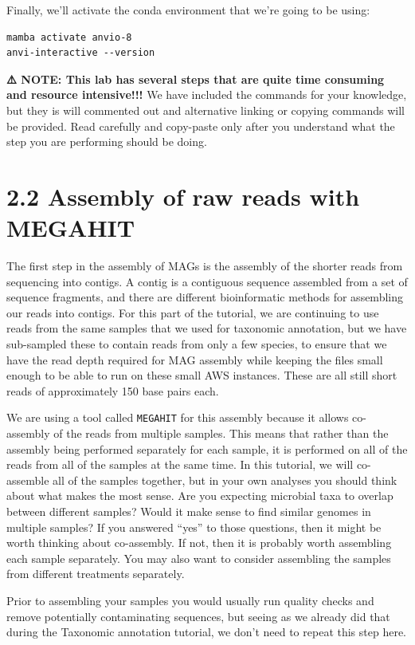\documentclass[
]{book}
\begin{document}
Finally, we'll activate the conda environment that we're going to be using:

\begin{verbatim}
mamba activate anvio-8
anvi-interactive --version
\end{verbatim}

\textbf{⚠️ NOTE: This lab has several steps that are quite time consuming and resource intensive!!!}
We have included the commands for your knowledge, but they is will commented out and alternative linking or copying commands will be provided. Read carefully and copy-paste only after you understand what the step you are performing should be doing.

\section{2.2 Assembly of raw reads with MEGAHIT}\label{assembly-of-raw-reads-with-megahit}

The first step in the assembly of MAGs is the assembly of the shorter reads from sequencing into contigs. A contig is a contiguous sequence assembled from a set of sequence fragments, and there are different bioinformatic methods for assembling our reads into contigs. For this part of the tutorial, we are continuing to use reads from the same samples that we used for taxonomic annotation, but we have sub-sampled these to contain reads from only a few species, to ensure that we have the read depth required for MAG assembly while keeping the files small enough to be able to run on these small AWS instances. These are all still short reads of approximately 150 base pairs each.

We are using a tool called \texttt{MEGAHIT} for this assembly because it allows co-assembly of the reads from multiple samples. This means that rather than the assembly being performed separately for each sample, it is performed on all of the reads from all of the samples at the same time. In this tutorial, we will co-assemble all of the samples together, but in your own analyses you should think about what makes the most sense. Are you expecting microbial taxa to overlap between different samples? Would it make sense to find similar genomes in multiple samples? If you answered ``yes'' to those questions, then it might be worth thinking about co-assembly. If not, then it is probably worth assembling each sample separately. You may also want to consider assembling the samples from different treatments separately.

Prior to assembling your samples you would usually run quality checks and remove potentially contaminating sequences, but seeing as we already did that during the Taxonomic annotation tutorial, we don't need to repeat this step here.
\end{document}

